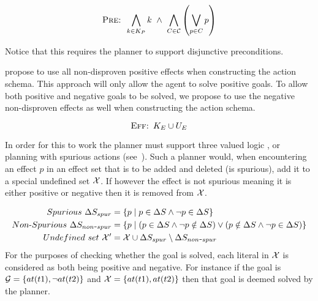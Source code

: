 \documentclass[\master/Master.tex]{subfiles}
\begin{document}
	\begin{equation} \label{eq:nca:opt-preconds}
		\textsc{Pre: } 
		\bigwedge\limits_{k \in K_P} k ~ \land ~ \bigwedge \limits_{C \in \mathcal{C}} \left( \bigvee \limits_{p \in C} p\right)
	\end{equation}

	Notice that this requires the planner to support disjunctive preconditions.

	\cite{Walsh2008} propose to use all non-disproven positive effects when constructing the action schema. 
	This approach will only allow the agent to solve positive goals.
	To allow both positive and negative goals to be solved, we propose to use the negative non-disproven effects as well when constructing the action schema.

	\begin{equation}
        \textsc{Eff: }  K_E \cup U_E
	\end{equation}

    In order for this to work the planner must support three valued logic \cite{putnam1957a}, or planning with spurious actions (see~\cite{Russell}).
	Such a planner would, when encountering an effect $p$ in an effect set \geffects that is to be added and deleted (is spurious), add it to a special undefined set $\mathcal{X}$.
	If however the effect is not spurious meaning it is either positive or negative then it is removed from $\mathcal{X}$.

			\begin{equation}
				\begin{split}
					Spurious~\Delta S_{spur} &= \{ p \mid p \in \Delta S \land \neg p \in \Delta S \} \\
					Non\text{-}Spurious~\Delta S_{non\texttt{-}spur} &= \{ p \mid (p \in \Delta S \land \neg p \notin \Delta S ) \lor (p \notin \Delta S \land \neg p \in \Delta S )  \}\\
					Undefined~set~\mathcal{X}' &= \mathcal{X} \cup \Delta S_{spur} \setminus \Delta S_{non\texttt{-}spur}
				\end{split}
			\end{equation}
	For the purposes of checking whether the goal is solved, each literal in $\mathcal{X}$ is considered as both being positive and negative.
	For instance if the goal is $\mathcal{G} = \{at(t1), \neg at(t2)\}$ and $\mathcal{X} = \{at(t1), at(t2)\}$ then that goal is deemed solved by the planner.
\end{document}
